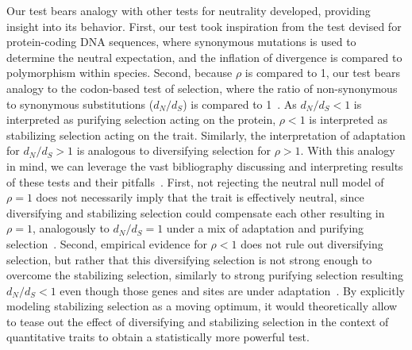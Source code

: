 \documentclass{article}
\newcommand{\dn}{d_N}
\newcommand{\ds}{d_S}
\newcommand{\dnds}{\dn / \ds}
\newcommand{\NI}{\rho}
\begin{document}
Our test bears analogy with other tests for neutrality developed, providing insight into its behavior.
First, our test took inspiration from the \textcite{mcdonald_adaptative_1991} test devised for protein-coding DNA sequences, where synonymous mutations is used to determine the neutral expectation, and the inflation of divergence is compared to polymorphism within species.
Second, because $\NI$ is compared to 1, our test bears analogy to the codon-based test of selection, where the ratio of non-synonymous to synonymous substitutions ($\dnds$) is compared to 1~\cite{goldman_codonbased_1994, muse_likelihood_1994}.
As $\dnds < 1$ is interpreted as purifying selection acting on the protein, $\NI < 1$ is interpreted as stabilizing selection acting on the trait.
Similarly, the interpretation of adaptation for $\dnds > 1$ is analogous to diversifying selection for $\NI > 1$.
With this analogy in mind, we can leverage the vast bibliography discussing and interpreting results of these tests and their pitfalls~\cite{nielsen_molecular_2005, anisimova_investigating_2009, jensen_importance_2019}.
First, not rejecting the neutral null model of $\NI = 1$ does not necessarily imply that the trait is effectively neutral, since diversifying and stabilizing selection could compensate each other resulting in $\NI = 1$, analogously to $\dnds=1$ under a mix of adaptation and purifying selection~\cite{nielsen_molecular_2005}.
Second, empirical evidence for $\NI < 1$ does not rule out diversifying selection, but rather that this diversifying selection is not strong enough to overcome the stabilizing selection, similarly to strong purifying selection resulting $\dnds < 1$ even though those genes and sites are under adaptation~\cite{latrille_genes_2023}.
By explicitly modeling stabilizing selection as a moving optimum, it would theoretically allow to tease out the effect of diversifying and stabilizing selection in the context of quantitative traits to obtain a statistically more powerful test.
\end{document}

